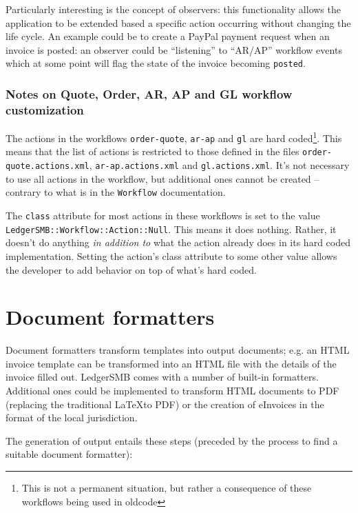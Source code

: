 Particularly interesting is the concept of observers:
this functionality allows the application to be extended based a specific action
occurring without changing the life cycle.  An example could be to create a PayPal
payment request when an invoice is posted: an observer could be ``listening'' to
``AR/AP'' workflow events which at some point will flag the state of the invoice
becoming \texttt{posted}.

\subsubsection{Notes on Quote, Order, AR, AP and GL workflow customization}
\label{subsubsec-customization-workflow-observers-notes}

The actions in the workflows \texttt{order-quote}, \texttt{ar-ap} and \texttt{gl} are
hard coded\footnote{This is not a permanent situation, but rather a consequence of
these workflows being used in \gls{oldcode}}.  This means that the list of actions is restricted to those defined in the
files \texttt{order-quote.actions.xml}, \texttt{ar-ap.actions.xml} and
\texttt{gl.actions.xml}.  It's not necessary to use all actions in the workflow, but
additional ones cannot be created -- contrary to what is in the \texttt{Workflow}
documentation.

The \texttt{class} attribute for most actions in these workflows is set to the value
\texttt{LedgerSMB::Workflow::Action::Null}.  This means it does nothing.  Rather, it
doesn't do anything \textit{in addition to} what the action already does in its hard
coded implementation.  Setting the action's class attribute to some other value allows
the developer to add behavior on top of what's hard coded.

\section{Document formatters}
\label{sec-customization-document-formatters}

Document formatters transform templates into output documents; e.g. an HTML invoice
template can be transformed into an HTML file with the details of the invoice filled
out.  LedgerSMB comes with a number of built-in formatters.  Additional ones could be
implemented to transform HTML documents to PDF (replacing the traditional \LaTeX to PDF)
or the creation of eInvoices in the format of the local jurisdiction.

The generation of output entails these steps (preceded by the process to find a
suitable document formatter):

